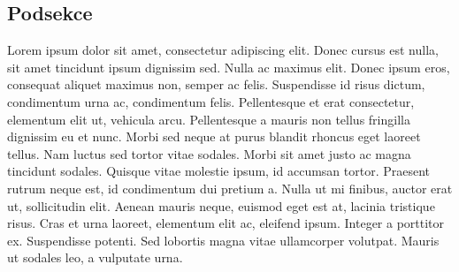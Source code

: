 \documentclass{report}
\begin{document}
	\subsection{Podsekce}
	Lorem ipsum dolor sit amet, consectetur adipiscing elit. Donec cursus 
	est nulla, sit amet tincidunt ipsum dignissim sed. Nulla ac maximus 
	elit. Donec ipsum eros, consequat aliquet maximus non, semper ac felis. 
	Suspendisse id risus dictum, condimentum urna ac, condimentum felis. 
	Pellentesque et erat consectetur, elementum elit ut, vehicula arcu. 
	Pellentesque a mauris non tellus fringilla dignissim eu et nunc. Morbi 
	sed neque at purus blandit rhoncus eget laoreet tellus. Nam luctus sed 
	tortor vitae sodales. Morbi sit amet justo ac magna tincidunt sodales. 
	Quisque vitae molestie ipsum, id accumsan tortor. Praesent rutrum neque 
	est, id condimentum dui pretium a. Nulla ut mi finibus, auctor erat ut, 
	sollicitudin elit. Aenean mauris neque, euismod eget est at, lacinia 
	tristique risus. Cras et urna laoreet, elementum elit ac, eleifend 
	ipsum.  Integer a porttitor ex. Suspendisse potenti. Sed lobortis magna 
	vitae ullamcorper volutpat. Mauris ut sodales leo, a vulputate urna.
\end{document}
